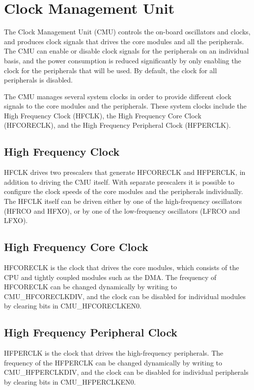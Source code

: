 \section{Clock Management Unit}\label{sec:cmu}
The Clock Management Unit (CMU) controls the on-board oscillators and clocks, and produces clock signals that drives the core modules and all the peripherals. The CMU can enable or disable clock signals for the peripherals on an individual basis, and the power consumption is reduced significantly by only enabling the clock for the peripherals that will be used. By default, the clock for all peripherals is disabled. 

The CMU manages several system clocks in order to provide different clock signals to the core modules and the peripherals. These system clocks include the High Frequency Clock (HFCLK), the High Frequency Core Clock (HFCORECLK), and the High Frequency Peripheral Clock (HFPERCLK).\cite{efm32gg-rm}

\subsection{High Frequency Clock}
HFCLK drives two prescalers that generate HFCORECLK and HFPERCLK, in addition to driving the CMU itself. With separate prescalers it is possible to configure the clock speeds of the core modules and the peripherals individually. The HFCLK itself can be driven either by one of the high-frequency oscillators (HFRCO and HFXO), or by one of the low-frequency oscillators (LFRCO and LFXO). 

\subsection{High Frequency Core Clock}
HFCORECLK is the clock that drives the core modules, which consists of the CPU and tightly coupled modules such as the DMA. The frequency of HFCORECLK can be changed dynamically by writing to CMU\_HFCORECLKDIV, and the clock can be disabled for individual modules by clearing bits in CMU\_HFCORECLKEN0. 

\subsection{High Frequency Peripheral Clock}
HFPERCLK is the clock that drives the high-frequency peripherals. The frequency of the HFPERCLK can be changed dynamically by writing to CMU\_HFPERCLKDIV, and the clock can be disabled for individual peripherals by clearing bits in CMU\_HFPERCLKEN0. 

